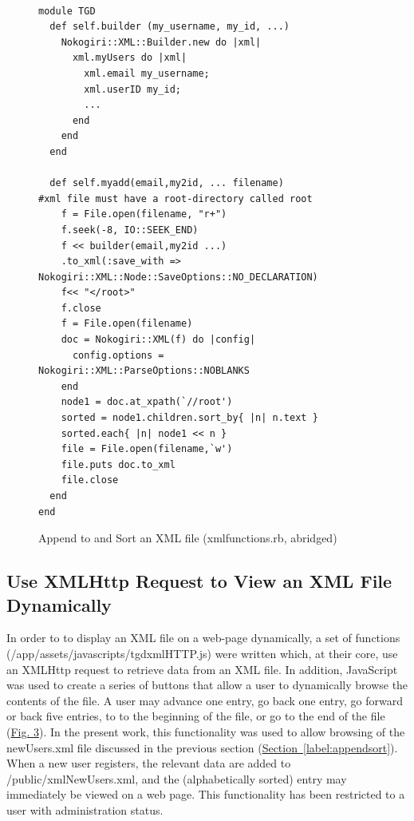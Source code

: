 \documentclass[11pt]{article}
\begin{document}
\begin{figure}[ht!] 
\begin{verbatim}
     
module TGD
  def self.builder (my_username, my_id, ...)
    Nokogiri::XML::Builder.new do |xml|
      xml.myUsers do |xml|
        xml.email my_username;
        xml.userID my_id;
        ...
      end
    end
  end

  def self.myadd(email,my2id, ... filename)
#xml file must have a root-directory called root
    f = File.open(filename, "r+")
    f.seek(-8, IO::SEEK_END)
    f << builder(email,my2id ...)
    .to_xml(:save_with => Nokogiri::XML::Node::SaveOptions::NO_DECLARATION)
    f<< "</root>"
    f.close
    f = File.open(filename)
    doc = Nokogiri::XML(f) do |config|
      config.options = Nokogiri::XML::ParseOptions::NOBLANKS
    end
    node1 = doc.at_xpath(`//root')
    sorted = node1.children.sort_by{ |n| n.text }
    sorted.each{ |n| node1 << n }
    file = File.open(filename,`w')
    file.puts doc.to_xml
    file.close
  end
end
\end{verbatim}
\label{label:xmlfns}
\hypertarget{label:figxmlfns}{\caption{Append to and Sort an XML file (xmlfunctions.rb, abridged)}}

\end{figure}






\hypertarget{label:secthttpz}{ \subsection{Use XMLHttp Request to View an XML File Dynamically}\label{label:httpz}}
In order to to display an XML file on a web-page dynamically,
a set of functions (/app/assets/javascripts/tgdxmlHTTP.js) were 
written which, at their core, use an XMLHttp request to retrieve 
data from an XML file. In addition, JavaScript was used to create
a series of buttons that allow a user to dynamically browse the
contents of the file. A user may advance one entry, go back one entry,
go forward or back five entries, to to the beginning of the file,
or go to the end of the file (\hyperlink{label:figdypict}{Fig. 3}).
In the present work, this functionality was used to allow browsing of
the newUsers.xml file discussed in the previous section (\hyperlink{label:sectappendsort}{Section~\ref{label:appendsort}}).
When
a new user registers, the relevant data are added to /public/xmlNewUsers.xml, 
and the (alphabetically sorted) entry may immediately be viewed on a
web page. 
This functionality has been restricted to a user with administration status.
 
\end{document}

